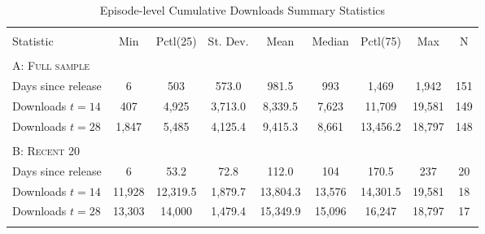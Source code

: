 \begin{table}[!htbp] \centering 
    \caption{Episode-level Cumulative Downloads Summary Statistics} 
    \label{episode-level-summary-stats} 
  \begin{tabular}{@{\extracolsep{5pt}}lcccccccc} 
  \\[-1.8ex]\hline \\[-1.8ex]
  Statistic & \multicolumn{1}{c}{Min} & \multicolumn{1}{c}{Pctl(25)} & \multicolumn{1}{c}{St. Dev.} & \multicolumn{1}{c}{Mean} & \multicolumn{1}{c}{Median} & \multicolumn{1}{c}{Pctl(75)} & \multicolumn{1}{c}{Max} & \multicolumn{1}{c}{N} \\
  \hline 
  \hline \\[-1.8ex]
  \textsc{A: Full sample} & & & & & & & & \\
  Days since release & 6 & 503 & 573.0 & 981.5 & 993 & 1,469 & 1,942 & 151 \\
  Downloads $t=14$ & 407 & 4,925 & 3,713.0 & 8,339.5 & 7,623 & 11,709 & 19,581 & 149 \\ 
  Downloads $t=28$ & 1,847 & 5,485 & 4,125.4 & 9,415.3 & 8,661 & 13,456.2 & 18,797 & 148 \\
  \hline \\[-1.8ex]
  \textsc{B: Recent 20} & & & & & & & & \\
  Days since release & 6 & 53.2 & 72.8 & 112.0 & 104 & 170.5 & 237 & 20 \\
  Downloads $t=14$ & 11,928 & 12,319.5 & 1,879.7 & 13,804.3 & 13,576 & 14,301.5 & 19,581 & 18 \\ 
  Downloads $t=28$ & 13,303 & 14,000 & 1,479.4 & 15,349.9 & 15,096 & 16,247 & 18,797 & 17 \\
  \hline
  \hline \\[-1.8ex] 
  \end{tabular}
\end{table}